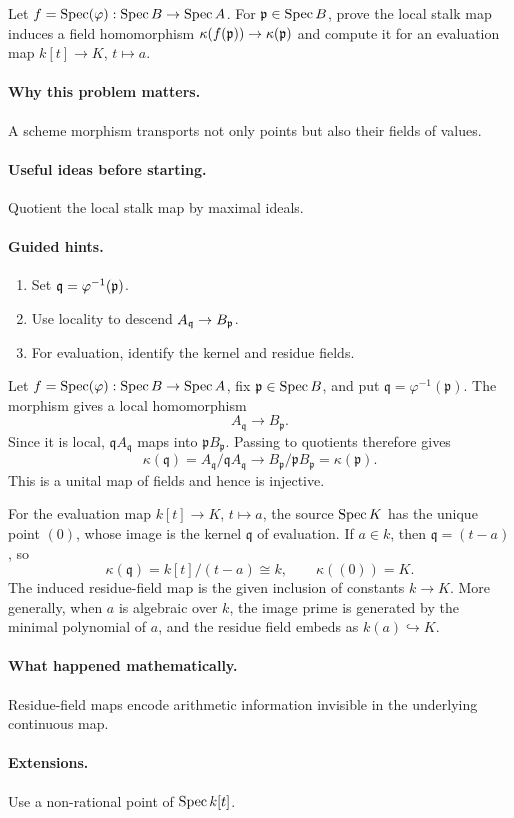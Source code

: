 \begin{problem}\label{prob:vi19-p09}
Let $f=\operatorname{Spec}(\varphi):\operatorname{Spec} B\to\operatorname{Spec} A$. For $\mathfrak p\in\operatorname{Spec} B$, prove the local stalk map induces a field homomorphism $\kappa(f(\mathfrak p))\to\kappa(\mathfrak p)$ and compute it for an evaluation map $k[t]\to K$, $t\mapsto a$.
\end{problem}

\ifdefined\FullProblemDossiers
\paragraph{Why this problem matters.}
A scheme morphism transports not only points but also their fields of values.

\paragraph{Useful ideas before starting.}
Quotient the local stalk map by maximal ideals.

\paragraph{Guided hints.}
\begin{enumerate}
\item Set $\mathfrak q=\varphi^{-1}(\mathfrak p)$.
\item Use locality to descend $A_\mathfrak q\to B_\mathfrak p$.
\item For evaluation, identify the kernel and residue fields.
\end{enumerate}

\begin{solution}
Let \(f=\operatorname{Spec}(\varphi):\operatorname{Spec} B\to\operatorname{Spec} A\), fix \(\mathfrak p\in\operatorname{Spec} B\), and put \(\mathfrak q=\varphi^{-1}(\mathfrak p)\).  The morphism gives a local homomorphism
\[
A_{\mathfrak q}\longrightarrow B_{\mathfrak p}.
\]
Since it is local, \(\mathfrak qA_{\mathfrak q}\) maps into \(\mathfrak pB_{\mathfrak p}\).  Passing to quotients therefore gives
\[
\kappa(\mathfrak q)
=A_{\mathfrak q}/\mathfrak qA_{\mathfrak q}
\longrightarrow
B_{\mathfrak p}/\mathfrak pB_{\mathfrak p}
=\kappa(\mathfrak p).
\]
This is a unital map of fields and hence is injective.

For the evaluation map \(k[t]\to K\), \(t\mapsto a\), the source \(\operatorname{Spec} K\) has the unique point \((0)\), whose image is the kernel \(\mathfrak q\) of evaluation.  If \(a\in k\), then \(\mathfrak q=(t-a)\), so
\[
\kappa(\mathfrak q)=k[t]/(t-a)\cong k,
\qquad
\kappa((0))=K.
\]
The induced residue-field map is the given inclusion of constants \(k\to K\).  More generally, when \(a\) is algebraic over \(k\), the image prime is generated by the minimal polynomial of \(a\), and the residue field embeds as \(k(a)\hookrightarrow K\).
\end{solution}

\paragraph{What happened mathematically.}
Residue-field maps encode arithmetic information invisible in the underlying continuous map.

\paragraph{Extensions.}
Use a non-rational point of $\operatorname{Spec} k[t]$.
\fi
